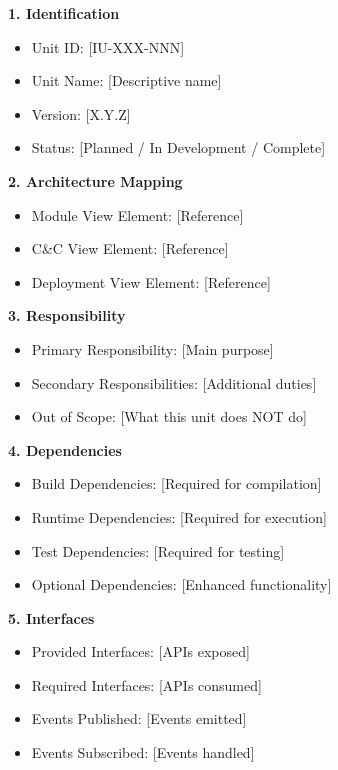 \documentclass[11pt]{article}
\begin{document}
\begin{devbox}

\textbf{1. Identification}
\begin{itemize}[nosep]
    \item Unit ID: [IU-XXX-NNN]
    \item Unit Name: [Descriptive name]
    \item Version: [X.Y.Z]
    \item Status: [Planned / In Development / Complete]
\end{itemize}

\textbf{2. Architecture Mapping}
\begin{itemize}[nosep]
    \item Module View Element: [Reference]
    \item C\&C View Element: [Reference]
    \item Deployment View Element: [Reference]
\end{itemize}

\textbf{3. Responsibility}
\begin{itemize}[nosep]
    \item Primary Responsibility: [Main purpose]
    \item Secondary Responsibilities: [Additional duties]
    \item Out of Scope: [What this unit does NOT do]
\end{itemize}

\textbf{4. Dependencies}
\begin{itemize}[nosep]
    \item Build Dependencies: [Required for compilation]
    \item Runtime Dependencies: [Required for execution]
    \item Test Dependencies: [Required for testing]
    \item Optional Dependencies: [Enhanced functionality]
\end{itemize}

\textbf{5. Interfaces}
\begin{itemize}[nosep]
    \item Provided Interfaces: [APIs exposed]
    \item Required Interfaces: [APIs consumed]
    \item Events Published: [Events emitted]
    \item Events Subscribed: [Events handled]
\end{itemize}


\end{devbox}
\end{document}
